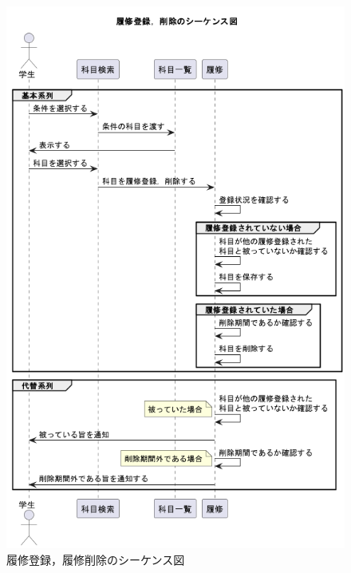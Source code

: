 \documentclass[documentclass]{jsarticle}
\begin{document}
\begin{figure}[H]
\begin{minipage}[b]{0.49\columnwidth}
      \includegraphics[width=1.0\columnwidth]{figure/6-2.png}
      \caption{履修登録，履修削除のシーケンス図}
      \label{fig:6-2}
  \end{minipage}
\end{figure}
\end{document}
